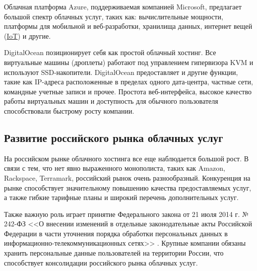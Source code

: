 Облачная платформа Azure, поддерживаемая компанией Microsoft, предлагает большой спектр облачных услуг, таких как: вычислительные мощности, платформы для мобильной и веб-разработки, хранилища данных, интернет вещей (\hyperlink{iot}{IoT}) и другие.

DigitalOcean позиционирует себя как простой облачный хостинг.
Все виртуальные машины (дроплеты) работают под управлением гипервизора KVM и используют SSD-накопители.
DigitalOcean предоставляет и другие функции, такие как IP-адреса расположенные в пределах одного дата-центра, частные сети, командные учетные записи и прочее.
Простота веб-интерфейса, высокое качество работы виртуальных машин и доступность для обычного пользователя способствовали быстрому росту компании.

\subsection{Развитие российского рынка облачных услуг}

На российском рынке облачного хостинга все еще наблюдается большой рост.
В связи с тем, что нет явно выраженного монополиста, таких как Amazon, Rackspace, Terramark, российский рынок очень разнообразный.
Конкуренция на рынке способствует значительному повышению качества предоставляемых услуг, а также гибкие тарифные планы и широкий перечень дополнительных услуг.

Также важную роль играет принятие Федерального закона от 21 июля 2014 г. № 242-ФЗ <<О внесении изменений в отдельные законодательные акты Российской Федерации в части уточнения порядка обработки персональных данных в информационно-телекоммуникационных сетях>> \cite{minsvyaz}.
Крупные компании обязаны хранить персональные данные пользователей на территории России, что способствует консолидации российского рынка облачных услуг.

